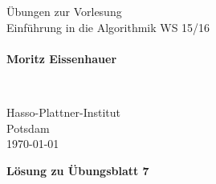 \documentclass{scrartcl}
\begin{document}
\pagestyle{plain}


\noindent
\begin{minipage}{0.66\textwidth}
Übungen zur Vorlesung\\
Einführung in die Algorithmik WS 15/16\\
~\\
\textbf{Moritz Eissenhauer}
\end{minipage}
~
\begin{minipage}{0.30\textwidth}
Hasso-Plattner-Institut\\
Potsdam\\
\today
\end{minipage}


\begin{center}
 \huge \bf Lösung zu Übungsblatt 7
\end{center}
\end{document}
